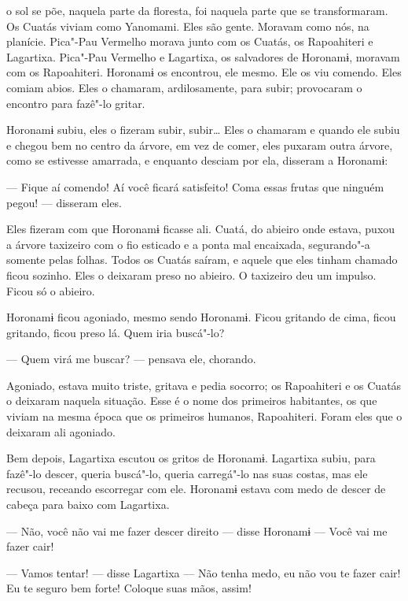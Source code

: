  

 o sol se põe, naquela parte da floresta, foi naquela parte que se
transformaram. Os Cuatás viviam como Yanomami. Eles são gente.
Moravam como nós, na planície. Pica"-Pau Vermelho morava junto com os
Cuatás, os Rapoahiteri e Lagartixa. Pica"-Pau Vermelho e
Lagartixa, os salvadores de Horonamɨ, moravam com os Rapoahiteri.
Horonamɨ os encontrou, ele mesmo. Ele os viu comendo. Eles comiam abios.
Eles o chamaram, ardilosamente, para subir; provocaram o encontro
para fazê"-lo gritar.

Horonamɨ subiu, eles o fizeram subir, subir… Eles o chamaram e
quando ele subiu e chegou bem no centro da árvore, em vez de comer, eles
puxaram outra árvore, como se estivesse amarrada, e enquanto desciam por
ela, disseram a Horonamɨ:

--- Fique aí comendo! Aí você ficará satisfeito! Coma essas frutas que
ninguém pegou! --- disseram eles.

Eles fizeram com que Horonamɨ ficasse ali. Cuatá, do abieiro onde
estava, puxou a árvore taxizeiro com o fio esticado e a ponta mal
encaixada, segurando"-a somente pelas folhas. Todos os Cuatás saíram, e
aquele que eles tinham chamado ficou sozinho. Eles o deixaram preso no
abieiro. O taxizeiro deu um impulso. Ficou só o abieiro. 

Horonamɨ ficou agoniado, mesmo sendo Horonamɨ. Ficou gritando de cima,
ficou gritando, ficou preso lá. Quem iria buscá"-lo? 

--- Quem virá me buscar? --- pensava ele, chorando. 

Agoniado, estava muito triste, gritava e pedia socorro;
os Rapoahiteri e os Cuatás o deixaram naquela
situação. Esse é o nome dos primeiros habitantes, os que viviam
na mesma época que os primeiros humanos, Rapoahiteri. Foram eles que o
deixaram ali agoniado. 

Bem depois, Lagartixa escutou os gritos de Horonamɨ. Lagartixa subiu,
para fazê"-lo descer, queria buscá"-lo, queria carregá"-lo nas suas costas,
mas ele recusou, receando escorregar com ele. Horonamɨ estava com medo
de descer de cabeça para baixo com Lagartixa. 

--- Não, você não vai me fazer descer direito --- disse
Horonamɨ --- Você vai me fazer cair! 

--- Vamos tentar! --- disse Lagartixa --- Não tenha medo, eu não vou te
fazer cair! Eu te seguro bem forte! Coloque suas mãos, assim! 

